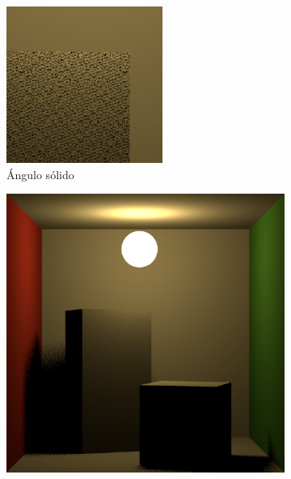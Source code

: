 \begin{figure}[h!]
{\begin{minipage}{\dimexpr .33\textwidth-\fboxsep-2\fboxrule}
\begin{subfigure}{\textwidth}
            \includegraphics[width=\textwidth]{imagenes/sphere52}
            \caption{Ángulo sólido}
            \end{subfigure}  
    \end{minipage}
    \hfill
\begin{minipage}{\dimexpr .33\textwidth-\fboxsep-2\fboxrule}
   \begin{subfigure}{\textwidth}
            \centering
            \includegraphics[width=\textwidth]{imagenes/sphere6}

\end{subfigure}
\end{minipage}}
\end{figure}
